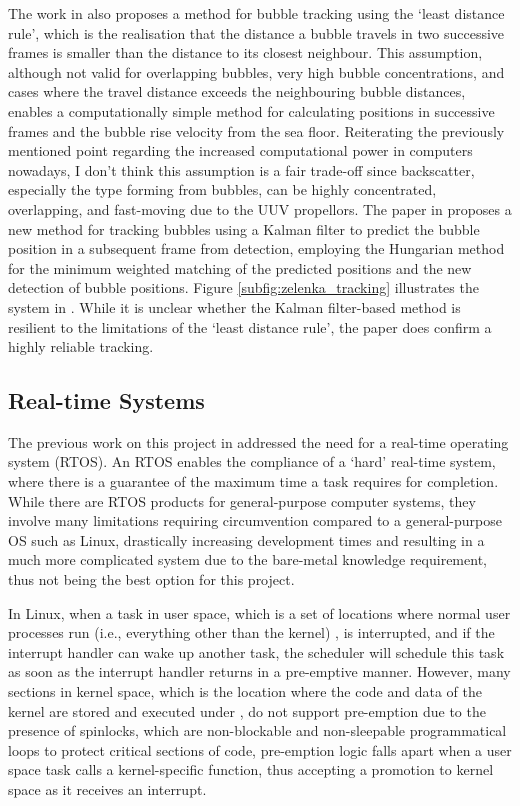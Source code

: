 The work in \cite{thomanekAutomatedGasBubble2010} also proposes a method for bubble tracking using the `least distance rule', which is the realisation that the distance a bubble travels in two successive frames is smaller than the distance to its closest neighbour. This assumption, although not valid for overlapping bubbles, very high bubble concentrations, and cases where the travel distance exceeds the neighbouring bubble distances, enables a computationally simple method for calculating positions in successive frames and the bubble rise velocity from the sea floor. Reiterating the previously mentioned point regarding the increased computational power in computers nowadays, I don't think this assumption is a fair trade-off since backscatter, especially the type forming from bubbles, can be highly concentrated, overlapping, and fast-moving due to the UUV propellors. The paper in \cite{zelenkaGasBubbleShape2014} proposes a new method for tracking bubbles using a Kalman filter \cite{kalmanNewApproachLinear1960} to predict the bubble position in a subsequent frame from detection, employing the Hungarian method \cite{kuhnHungarianMethodAssignment1955} for the minimum weighted matching of the predicted positions and the new detection of bubble positions. Figure \ref{subfig:zelenka_tracking} illustrates the system in \cite{zelenkaGasBubbleShape2014}. While it is unclear whether the Kalman filter-based method is resilient to the limitations of the `least distance rule', the paper \cite{zelenkaGasBubbleShape2014} does confirm a highly reliable tracking.

\subsection{Real-time Systems}
\label{bi_rt}
The previous work on this project in \cite{katieshepherdMachineVisionBased2023} addressed the need for a real-time operating system (RTOS). An RTOS enables the compliance of a `hard' real-time system, where there is a guarantee of the maximum time a task requires for completion. While there are RTOS products for general-purpose computer systems, they involve many limitations requiring circumvention compared to a general-purpose OS such as Linux, drastically increasing development times and resulting in a much more complicated system due to the bare-metal knowledge requirement, thus not being the best option for this project.

In Linux, when a task in user space, which is a set of locations where normal user processes run (i.e., everything other than the kernel) \cite{nlightnfotisAnswerWhatDifference2013}, is interrupted, and if the interrupt handler can wake up another task, the scheduler will schedule this task as soon as the interrupt handler returns in a pre-emptive manner. However, many sections in kernel space, which is the location where the code and data of the kernel are stored and executed under \cite{nlightnfotisAnswerWhatDifference2013}, do not support pre-emption due to the presence of spinlocks, which are non-blockable and non-sleepable programmatical loops to protect critical sections of code, pre-emption logic falls apart when a user space task calls a kernel-specific function, thus accepting a promotion to kernel space as it receives an interrupt.

